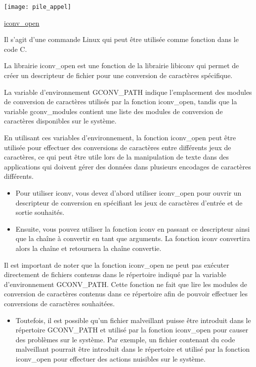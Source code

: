 \documentclass[12pt,a4paper]{article}
\begin{document}
\begin{flushleft}
                \begin{center}
                    \texttt{[image: pile\_appel]}
                \end{center}
            \item \underline{iconv\_open }
                \item Il s’agit d’une commande Linux qui peut être utilisée comme fonction dans le code C. 
                \item La librairie iconv\_open est une fonction de la librairie libiconv qui permet de créer un descripteur de fichier pour une conversion de caractères spécifique. 
                \item La variable d'environnement GCONV\_PATH indique l'emplacement des modules de conversion de caractères utilisés par la fonction iconv\_open, tandis que la variable gconv\_modules contient une liste des modules de conversion de caractères disponibles sur le système.
                \item En utilisant ces variables d'environnement, la fonction iconv\_open peut être utilisée pour effectuer des conversions de caractères entre différents jeux de caractères, ce qui peut être utile lors de la manipulation de texte dans des applications qui doivent gérer des données dans plusieurs encodages de caractères différents.
                \begin{itemize}
                    \item Pour utiliser iconv, vous devez d'abord utiliser iconv\_open pour ouvrir un descripteur de conversion en spécifiant les jeux de caractères d'entrée et de sortie souhaités. 
                    \item Ensuite, vous pouvez utiliser la fonction iconv en passant ce descripteur ainsi que la chaîne à convertir en tant que arguments. La fonction iconv convertira alors la chaîne et retournera la chaîne convertie.
                \end{itemize}
                \item Il est important de noter que la fonction iconv\_open ne peut pas exécuter directement de fichiers contenus dans le répertoire indiqué par la variable d'environnement GCONV\_PATH. Cette fonction ne fait que lire les modules de conversion de caractères contenus dans ce répertoire afin de pouvoir effectuer les conversions de caractères souhaitées.
                \begin{itemize}
                    \item Toutefois, il est possible qu'un fichier malveillant puisse être introduit dans le répertoire GCONV\_PATH et utilisé par la fonction iconv\_open pour causer des problèmes sur le système. Par exemple, un fichier contenant du code malveillant pourrait être introduit dans le répertoire et utilisé par la fonction iconv\_open pour effectuer des actions nuisibles sur le système.

\end{itemize}
\end{flushleft}
\end{document}
